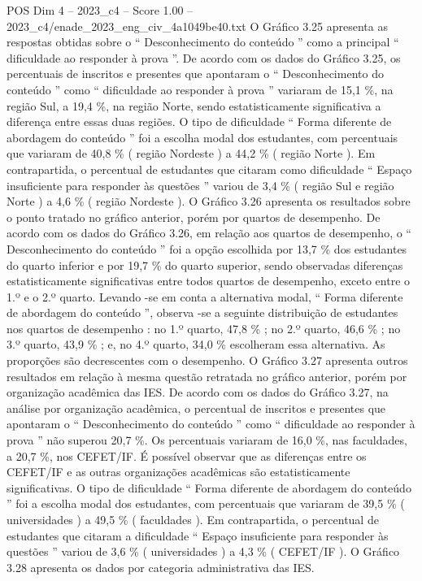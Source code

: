 \begin{textsample}{POS Dim 4 – 2023\_c4 – Score 1.00 – 2023\_c4/enade\_2023\_eng\_civ\_4a1049be40.txt}
O Gráfico 3.25 apresenta as respostas obtidas sobre o “ Desconhecimento do conteúdo ” como a principal “ dificuldade ao responder à prova ”.
De acordo com os dados do Gráfico 3.25, os percentuais de inscritos e presentes que apontaram o “ Desconhecimento do conteúdo ” como “ dificuldade ao responder à prova ” variaram de 15,1 \%, na região Sul, a 19,4 \%, na região Norte, sendo estatisticamente significativa a diferença entre essas duas regiões.
O tipo de dificuldade “ Forma diferente de abordagem do conteúdo ” foi a escolha modal dos estudantes, com percentuais que variaram de 40,8 \% ( região Nordeste ) a 44,2 \% ( região Norte ).
Em contrapartida, o percentual de estudantes que citaram como dificuldade “ Espaço insuficiente para responder às questões ” variou de 3,4 \% ( região Sul e região Norte ) a 4,6 \% ( região Nordeste ).
O Gráfico 3.26 apresenta os resultados sobre o ponto tratado no gráfico anterior, porém por quartos de desempenho.
De acordo com os dados do Gráfico 3.26, em relação aos quartos de desempenho, o “ Desconhecimento do conteúdo ” foi a opção escolhida por 13,7 \% dos estudantes do quarto inferior e por 19,7 \% do quarto superior, sendo observadas diferenças estatisticamente significativas entre todos quartos de desempenho, exceto entre o 1.º e o 2.º quarto.
Levando -se em conta a alternativa modal, “ Forma diferente de abordagem do conteúdo ”, observa -se a seguinte distribuição de estudantes nos quartos de desempenho : no 1.º quarto, 47,8 \% ; no 2.º quarto, 46,6 \% ; no 3.º quarto, 43,9 \% ; e, no 4.º quarto, 34,0 \% escolheram essa alternativa.
As proporções são decrescentes com o desempenho.
O Gráfico 3.27 apresenta outros resultados em relação à mesma questão retratada no gráfico anterior, porém por organização acadêmica das IES.
De acordo com os dados do Gráfico 3.27, na análise por organização acadêmica, o percentual de inscritos e presentes que apontaram o “ Desconhecimento do conteúdo ” como “ dificuldade ao responder à prova ” não superou 20,7 \%.
Os percentuais variaram de 16,0 \%, nas faculdades, a 20,7 \%, nos CEFET/IF.
É possível observar que as diferenças entre os CEFET/IF e as outras organizações acadêmicas são estatisticamente significativas.
O tipo de dificuldade “ Forma diferente de abordagem do conteúdo ” foi a escolha modal dos estudantes, com percentuais que variaram de 39,5 \% ( universidades ) a 49,5 \% ( faculdades ).
Em contrapartida, o percentual de estudantes que citaram a dificuldade “ Espaço insuficiente para responder às questões ” variou de 3,6 \% ( universidades ) a 4,3 \% ( CEFET/IF ).
O Gráfico 3.28 apresenta os dados por categoria administrativa das IES.

\end{textsample}
